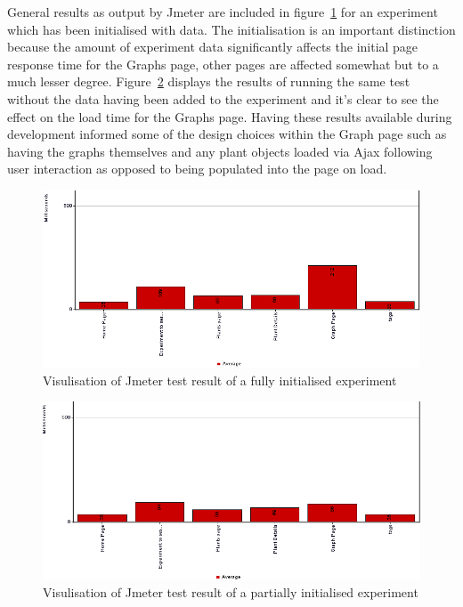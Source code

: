 General results as output by Jmeter are included in figure~\ref{fig:jmeter_with_data} for an experiment which has been initialised with data. The initialisation is an important distinction because the amount of experiment data significantly affects the initial page response time for the Graphs page, other pages are affected somewhat but to a much lesser degree. Figure~\ref{fig:jmeter_no_data} displays the results of running the same test without the data having been added to the experiment and it's clear to see the effect on the load time for the Graphs page. Having these results available during development informed some of the design choices within the Graph page such as having the graphs themselves and any plant objects loaded via Ajax following user interaction as opposed to being populated into the page on load.
\begin{figure}[H]
    \centering
    \includegraphics[width=\textwidth]{images/testing/jmeter_final_crop}
    \caption{Visulisation of Jmeter test result of a fully initialised experiment}
    \label{fig:jmeter_with_data}
\end{figure} 

\begin{figure}[H]
    \centering
    \includegraphics[width=\textwidth]{images/testing/jmeter_no_data_crop}
    \caption{Visulisation of Jmeter test result of a partially initialised experiment}
    \label{fig:jmeter_no_data}
\end{figure} 

